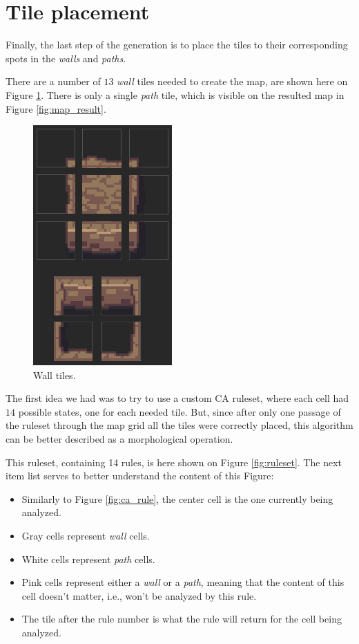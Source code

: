 \section{Tile placement}

Finally, the last step of the generation is to place the tiles to their corresponding spots in the \emph{walls} and \emph{paths}.

There are a number of \(13\) \emph{wall} tiles needed to create the map, are shown here on Figure \ref{fig:wall_tiles}. There is only a single \emph{path} tile, which is visible on the resulted map in Figure \ref{fig:map_result}.

\begin{figure}[h]
    \caption{Wall tiles.}
    \centerline{\includegraphics{images/development/wall_tiles.png}}
    \label{fig:wall_tiles}
\end{figure}

The first idea we had was to try to use a custom CA ruleset, where each cell had \(14\) possible states, one for each needed tile. But, since after only one passage of the ruleset through the map grid all the tiles were correctly placed, this algorithm can be better described as a morphological operation.

This ruleset, containing 14 rules, is here shown on Figure \ref{fig:ruleset}. The next item list serves to better understand the content of this Figure:

\begin{itemize}
    \item Similarly to Figure \ref{fig:ca_rule}, the center cell is the one currently being analyzed.
    \item Gray cells represent \emph{wall} cells.
    \item White cells represent \emph{path} cells.
    \item Pink cells represent either a \emph{wall} or a \emph{path}, meaning that the content of this cell doesn't matter, i.e., won't be analyzed by this rule.
    \item The tile after the rule number is what the rule will return for the cell being analyzed. 
\end{itemize}

